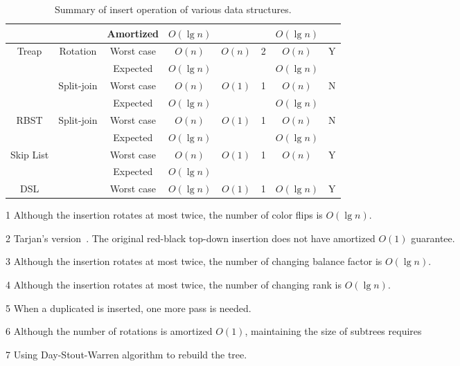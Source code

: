 \begin{table}[!t]
\begin{threeparttable}
\begin{tabular}{cccccccc}
  & & Amortized & $O(\lg n)$ & & & $O(\lg n)$ & \\
  \hline
  \multirow{4}{*}{Treap} & \multirow{2}{*}{Rotation} & Worst case & $O(n)$ & \multirow{2}{*}{$O(n)$} & \multirow{2}{*}{2} & $O(n)$ & \multirow{2}{*}{Y} \\
  & & Expected & $O(\lg n)$ &  & & $O(\lg n)$ & \\
  & \multirow{2}{*}{Split-join} & Worst case & $O(n)$ & \multirow{2}{*}{$O(1)$} & \multirow{2}{*}{1} & $O(n)$ & \multirow{2}{*}{N} \\
  & & Expected & $O(\lg n)$ & & & $O(\lg n)$ & \\
  \hline
  \multirow{2}{*}{RBST} & \multirow{2}{*}{Split-join}& Worst case & $O(n)$ & \multirow{2}{*}{$O(1)$} & \multirow{2}{*}{1} & $O(n)$ & \multirow{2}{*}{N} \\
  & & Expected & $O(\lg n)$ &  & & $O(\lg n)$ & \\
  \hline
  \multirow{2}{*}{Skip List} & & Worst case & $O(n)$ & \multirow{2}{*}{$O(1)$} & \multirow{2}{*}{1} & \multirow{2}{*}{$O(n)$} & \multirow{2}{*}{Y} \\
  & & Expected & $O(\lg n)$ & & & & \\
  \hline
  DSL & & Worst case & $O(\lg n)$ & $O(1)$ & 1 & $O(\lg n)$ & Y \\
\end{tabular}
\begin{tablenotes}\footnotesize
\item[1] Although the insertion rotates at most twice, the number of color flips is $O(\lg n)$.
\item[2] Tarjan's version~\cite{Tarjan1985}. The original red-black top-down insertion does not have amortized $O(1)$ guarantee.
\item[3] Although the insertion rotates at most twice, the number of changing balance factor is $O(\lg n)$.
\item[4] Although the insertion rotates at most twice, the number of changing rank is $O(\lg n)$.
\item[5] When a duplicated is inserted, one more pass is needed.
\item[6] Although the number of rotations is amortized $O(1)$, maintaining the size of subtrees requires
\item[7] Using Day-Stout-Warren algorithm to rebuild the tree.
\end{tablenotes}
\caption{Summary of insert operation of various data structures.}\label{insert}
\end{threeparttable}
\end{table}

